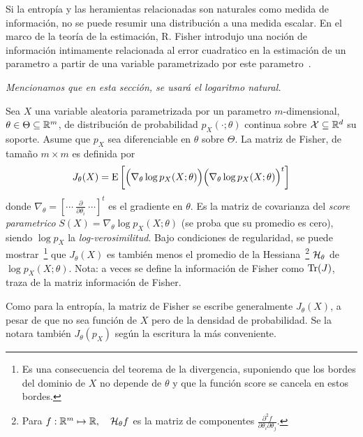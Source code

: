 




Si  la entrop\'ia  y las  heramientas relacionadas  son naturales  como  medida de
informaci\'on, no se  puede resumir una distribuci\'on a  una medida escalar. En
el marco  de la teor\'ia de la  estimaci\'on, R. Fisher introdujo  una noci\'on de
informaci\'on intimamente relacionada al  error cuadratico en la estimaci\'on de
un   parametro    a   partir   de   una   variable    parametrizado   por   este
parametro~\cite{Fis22,  Fis25:07,   Kay93,  Bos07,  CovTho06, Fri04}.

{\it Mencionamos que en esta secci\'on, se usar\'a el logaritmo natural.}
%
\begin{definicion}
  Sea $X$ una variable aleatoria parametrizada por un parametro $m$-dimensional,
  $\theta  \in  \Theta \subseteq  \mathbb{R}^m$,  de  distribuci\'on de  probabilidad
  $p_X(\cdot;\theta)$ continua  sobre $\mathcal{X}  \subseteq \mathbb{R}^d$ su  soporte. Asume
  que $p_X$ sea diferenciable en  $\theta$ sobre $\Theta$.  La matriz de Fisher,
  de tama\~no $m \times m$ es definida por
  \[
  J_\theta(X)  =  \operatorname{E}\left[  \Big(  \nabla_\theta \log  p_X(X;\theta)  \Big)
    \Big( \nabla_\theta \log p_X(X;\theta) \Big)^t \right]
  \]
  donde $\nabla_\theta = \left[  \cdots \: \frac{\partial}{\partial \theta_i} \:
    \cdots \right]^t$ es  el gradiente en $\theta$.  Es  la matriz de covarianza
  del  {\it score  parametrico} $S(X)  = \nabla_\theta  \log  p_X(X;\theta)$ (se
  proba que su promedio es  cero), siendo $\log p_X$ la {\it log-verosimilitud}.
  Bajo   condiciones   de  regularidad,   se   puede  mostrar~\footnote{Es   una
    consecuencia del  teorema de la  divergencia, suponiendo que los  bordes del
    dominio de $X$ no depende de $\theta$ y que la funci\'on score se cancela en
    estos  bordes.}  que  $J_\theta(X)$ es  tambi\'en  menos el  promedio de  la
  Hessiana~\footnote{Para $f:  \mathbb{R}^m \mapsto \mathbb{R}, \quad  \mathcal{H}_\theta f$ es
    la  matriz de  componentes $\frac{\partial^2  f}{\partial  \theta_i \partial
      \theta_j}$.}  $\mathcal{H}_\theta$ de  $\log  p_X(X;\theta)$.  Nota:  a veces  se
  define  la  informaci\'on  de  Fisher   como  $\operatorname{Tr}(J)$,  traza  de  la  matriz
  informaci\'on de Fisher.
\end{definicion}
%
Como  para   la  entrop\'ia,   la  matriz  de   Fisher  se   escribe  generalmente
$J_\theta(X)$, a  pesar de que no  sea funci\'on de  $X$ pero de la  densidad de
probabilidad. Se  la notara tambi\'en  $J_\theta(p_X)$ seg\'un la  escritura la
m\'as conveniente.

